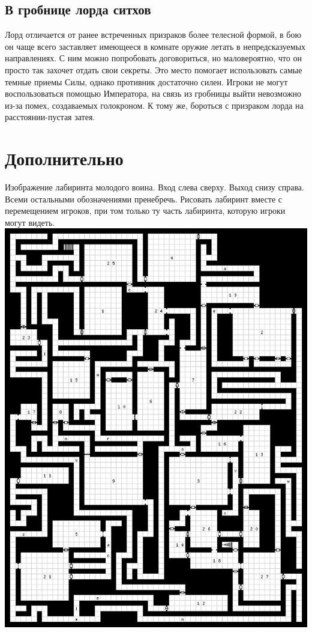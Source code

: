 \documentclass{article}
\begin{document}
\subsection{В гробнице лорда ситхов}
\begin{myquote}
\color{sw}

\end{myquote}
Лорд отличается от ранее встреченных призраков более телесной формой, в бою он чаще всего заставляет имеющееся в комнате оружие летать в непредсказуемых направлениях.
С ним можно попробовать договориться, но маловероятно, что он просто так захочет отдать свои секреты.
Это место помогает использовать самые темные приемы Силы, однако противник достаточно силен.
Игроки не могут воспользоваться помощью Императора, на связь из гробницы выйти невозможно из-за помех, создаваемых голокроном. К тому же, бороться с призраком лорда на расстоянии-пустая затея.

\section{Дополнительно}
\label{5000}
Изображение лабиринта молодого воина.
Вход слева сверху.
Выход снизу справа.
Всеми остальными обозначениями пренебречь.
Рисовать лабиринт вместе с перемещением игроков, при том только ту часть лабиринта, которую игроки могут видеть.
\newline
\includegraphics[width=1\textwidth]{imgs/labirint} \label{lab_img}
\end{document}
